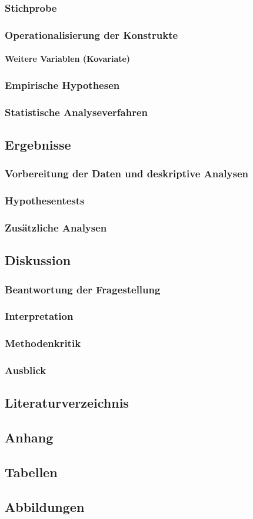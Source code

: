 \subsubsection{Stichprobe}
\subsubsection{Operationalisierung der Konstrukte}
\paragraph{Weitere Variablen (Kovariate)}
\subsubsection{Empirische Hypothesen}
\subsubsection{Statistische Analyseverfahren}
\subsection{Ergebnisse}
\subsubsection{Vorbereitung der Daten und deskriptive Analysen}
\subsubsection{Hypothesentests}
\subsubsection{Zusätzliche Analysen}
\subsection{Diskussion}
\subsubsection{Beantwortung der Fragestellung}
\subsubsection{Interpretation}
\subsubsection{Methodenkritik}
\subsubsection{Ausblick}
\subsection{Literaturverzeichnis}
\subsection{Anhang}
\subsection{Tabellen}
\subsection{Abbildungen}

